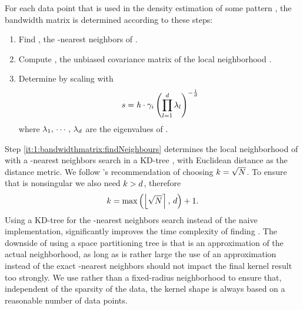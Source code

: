 	For each data point \varPattern[\itXis] that is used in the density estimation of some pattern \varPattern[\itXs], the bandwidth matrix is determined according to these steps:
		\begin{enumerate}[labelindent=0ex]
			\item \label{it:1:bandwidthmatrix:findNeighbours}
				Find \varNeighborhood{\varPattern[\itXis]}, the \KNNK-nearest neighbors of \varPattern[\itXis].
			\item \label{it:1:bandwidthmatrix:initialBandwidthMatrix}
				Compute \varCovarianceMatrix, the unbiased covariance matrix of the local neighborhood \varNeighborhood{\varPattern[\itXis]}.
			\item \label{it:1:bandwidthmatrix:scaleBandwidhtMatrix}
				Determine \varBandwidthMatrix[\itXis] by scaling \varCovarianceMatrix with
				\begin{equation}\label{eq:method:scalingFactor}
					s = \mathit{h} \cdot \gamma_{i} 
				 \left( \displaystyle\prod_{l = 1}^{d} \lambda_{l} \right)^{-\frac{1}{d}}
				\end{equation}
				where $\lambda_1,\, \cdots,\, \lambda_d$ are the eigenvalues of \varCovarianceMatrix.  
		\end{enumerate}	
		Step \ref{it:1:bandwidthmatrix:findNeighbours} determines the local neighborhood of \varPattern[\itXis] with a \KNNK-nearest neighbors search in a KD-tree \cite{Bentley1975Multidimensional}, with Euclidean distance as the distance metric. 
		We follow \citeauthor{silverman1986density}'s \cite{silverman1986density} recommendation of choosing $k = \sqrt{N}$. To ensure that \varCovarianceMatrix is nonsingular we also need $k > d$, therefore
		\begin{equation}\label{eq:method:k}
			k = \max\left(\left\lfloor \sqrt{N} \right\rceil,\, d \right) + 1.	
		\end{equation}			
		Using a KD-tree for the \KNNK-nearest neighbors search instead of the naive implementation, significantly improves the time complexity of finding \varBandwidthMatrix[\itXis]. The downside of using a space partitioning tree is that \varNeighborhood{\varPattern[\itXis]} is an approximation of the actual neighborhood, as long as \KNNK is rather large the use of an approximation instead of the exact \KNNK-nearest neighbors should not impact the final kernel result too strongly. 
		We use \KNN rather than a fixed-radius neighborhood to ensure that, independent of the sparsity of the data, the kernel shape is always based on a reasonable number of data points. 

